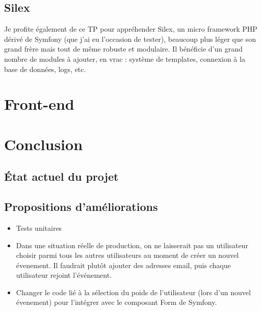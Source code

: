\documentclass[a4paper, 11pt]{article}
\begin{document}
\subsection{Silex}
Je profite également de ce TP pour appréhender Silex, un micro framework PHP dérivé de Symfony (que j'ai eu l'occasion 
de tester), beaucoup plus léger que son grand frère mais tout de même robuste et modulaire. Il bénéficie d'un 
grand nombre de modules à ajouter, en vrac : système de templates, connexion à la base de données, logs, etc.





\section{Front-end}



\section{Conclusion}
\subsection{État actuel du projet}

\subsection{Propositions d'améliorations}
\begin{itemize}
	\item Tests unitaires
	\item Dans une situation réelle de production, on ne laisserait pas un utilisateur choisir parmi tous les autres 
			utilisateurs au moment de créer un nouvel évenement. Il faudrait plutôt ajouter des adresses email, puis 
			chaque utilisateur rejoint l'événement.
	\item Changer le code lié à la sélection du poids de l'utilisateur (lors d'un nouvel évenement) pour l'intégrer 
			avec le composant Form de Symfony.
\end{itemize}
\end{document}
